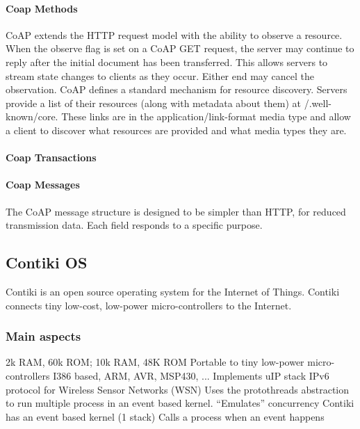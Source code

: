 \paragraph{Coap Methods}
CoAP extends the HTTP request model with the ability to observe a resource.
When the observe flag is set on a CoAP GET request,
	the server may continue to reply after the initial document has been transferred. This allows servers to stream state
	changes to clients as they occur. Either end may cancel the observation.
	CoAP defines a standard mechanism for resource discovery. Servers provide a list
	of their resources (along with metadata about them) at /.well-known/core. These links
	are in the application/link-format media type and allow a client to discover what
	resources are provided and what media types they are.

\paragraph{Coap Transactions}

\paragraph{Coap Messages}
The CoAP message structure is designed to be simpler than HTTP,
	for reduced transmission data.
Each field responds to a specific purpose.


\subsection{Contiki OS}
Contiki is an open source operating system for the Internet of Things.
Contiki connects tiny low-cost,
	low-power micro-controllers to the Internet.

\subsubsection{Main aspects}
2k RAM, 60k ROM; 10k RAM, 48K ROM
Portable to tiny low-power micro-controllers
I386 based, ARM, AVR, MSP430, ...
Implements uIP stack
IPv6 protocol for Wireless Sensor Networks (WSN)
Uses the protothreads abstraction to run multiple process in an event based
kernel.
“Emulates” concurrency
Contiki has an event based kernel (1 stack)
Calls a process when an event happens

